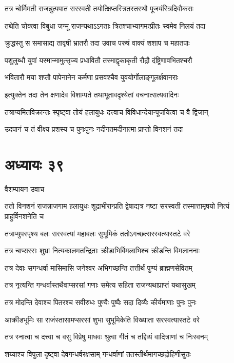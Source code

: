 \twolineshloka
{तत्र चोर्मिमती राजन्नुत्पपात सरस्वती}
{तयोत्क्षिप्तस्त्रितस्तस्थौ पूजयंस्त्रिदिवौकसः}


\twolineshloka
{तथेति चोक्त्वा विबुधा जग्मू राजन्यथाऽऽगताः}
{त्रितश्चाभ्यागमत्प्रीतः स्वमेव निलयं तदा}


\twolineshloka
{क्रुद्धस्तु स समासाद्य तावृषी भ्रातरौ तदा}
{उवाच परुषं वाक्यं शशाप च महातपाः}


\twolineshloka
{पशुलुब्धौ युवां यस्मान्मामुत्सृज्य प्रधावितौ}
{तस्माद्वृकाकृती रौद्रौ दंष्ट्रिणावभितश्चरौ}


\twolineshloka
{भवितारौ मया शप्तौ पापेनानेन कर्मणा}
{प्रसवश्चैव युवयोर्गोलाङ्गूलर्क्षवानराः}


\twolineshloka
{इत्युक्तेन तदा तेन क्षणादेव विशाम्पते}
{तथाभूतावदृश्येतां वचनात्सत्यवादिनः}


\twolineshloka
{तत्राप्यमितविक्रान्तः स्पृष्ट्वा तोयं हलायुधः}
{दत्त्वाच विविधान्देयान्पूजयित्वा च वै द्विजान्}


\twolineshloka
{उदपानं च तं वीक्ष्य प्रशस्य च पुनःपुनः}
{नदीगतमदीनात्मा प्राप्तो विनशनं तदा}


\chapter{अध्यायः ३९}
\twolineshloka
{वैशम्पायन उवाच}
{}


\threelineshloka
{ततो विनशनं राजन्नाजगाम हलायुधः}
{शूद्राभीरान्प्रति द्वेषाद्यत्र नष्टा सरस्वती}
{तस्मात्तामृषयो नित्यं प्राहुर्विनशनेति च}


\twolineshloka
{तत्राप्युपस्पृश्य बलः सरस्वत्यां महाबलः}
{सुभूमिकं ततोऽगच्छत्सरस्वत्यास्तटे वरे}


\twolineshloka
{तत्र चाप्सरसः शुभ्रा नित्यकालमतन्द्रिताः}
{क्रीडाभिर्विमलाभिश्च क्रीडन्ति विमलाननाः}


\twolineshloka
{तत्र देवाः सगन्धर्वा मासिमासि जनेश्वर}
{अभिगच्छन्ति तत्तीर्थं पुण्यं ब्राह्मणसेवितम्}


\twolineshloka
{तत्र नृत्यन्ति गन्धर्वास्तथैवाप्सरसां गणाः}
{समेत्य सहिता राजन्यथाप्राप्तं यथासुखम्}


\twolineshloka
{तत्र मोदन्ति देवाश्च पितरश्च सवीरुधः}
{पुण्यैः पुष्पैः सदा दिव्यैः कीर्यमाणाः पुनः पुनः}


\twolineshloka
{आक्रीडभूमिः सा राजंस्तासामप्सरसां शुभा}
{सुभूमिकेति विख्याता सरस्वत्यास्तटे वरे}


\twolineshloka
{तत्र स्नात्वा च दत्त्वा च वसु विप्रेषु माधवः}
{श्रुत्वा गीतं च तद्दिव्यं वादित्राणां च निःस्वनम्}


\twolineshloka
{शय्याश्च विपुला दृष्ट्वा देवगन्धर्वरक्षसाम्}
{गन्धर्वाणां ततस्तीर्थमागच्छद्रोहिणीसुतः}


